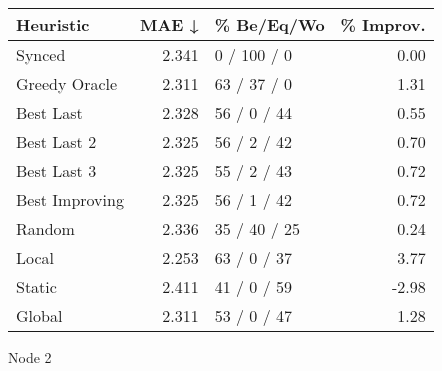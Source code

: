 \begin{tabular}{lrlr}
\toprule
\textbf{Heuristic} & \textbf{MAE ↓} & \textbf{\% Be/Eq/Wo} & \textbf{\% Improv.} \\
\midrule
            Synced &          2.341 &          0 / 100 / 0 &                0.00 \\
     Greedy Oracle &          2.311 &          63 / 37 / 0 &                1.31 \\
         Best Last &          2.328 &          56 / 0 / 44 &                0.55 \\
       Best Last 2 &          2.325 &          56 / 2 / 42 &                0.70 \\
       Best Last 3 &          2.325 &          55 / 2 / 43 &                0.72 \\
    Best Improving &          2.325 &          56 / 1 / 42 &                0.72 \\
            Random &          2.336 &         35 / 40 / 25 &                0.24 \\
             Local &          2.253 &          63 / 0 / 37 &                3.77 \\
            Static &          2.411 &          41 / 0 / 59 &               -2.98 \\
            Global &          2.311 &          53 / 0 / 47 &                1.28 \\
\bottomrule
\end{tabular}
\caption{Node 2}
\label{tab:ds_non_lr01_le1_bs2_2}
